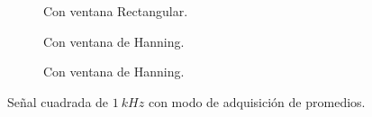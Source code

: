 \begin{figure}[H]
\begin{subfigure}[H]{0.40\textwidth}
          \caption{Con ventana Rectangular.}
        \end{subfigure}
        \hfill 
        \begin{subfigure}[H]{0.40\textwidth}
          \caption{Con ventana de Hanning.}
        \end{subfigure}
        \hfill 
        \begin{subfigure}[H]{0.40\textwidth}
          \caption{Con ventana de Hanning.}
        \end{subfigure}

        \caption{Señal cuadrada de $1~kHz$ con modo de adquisición de promedios.}
        \label{fig:SeñalCuad_MedicAmplOscilo}
      \end{figure}

